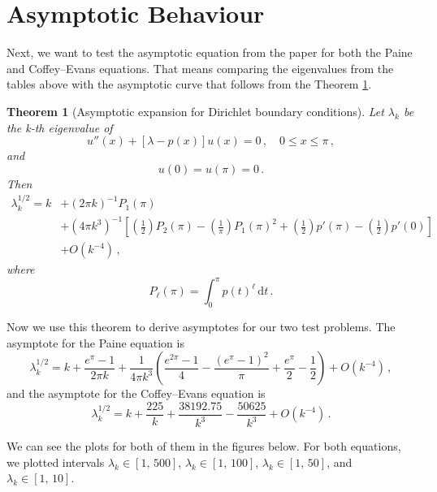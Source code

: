 \documentclass[11pt,a4paper,oneside,openright]{report} %
\newtheorem{theorem}{Theorem}
\begin{document}
\section{Asymptotic Behaviour}
\noindent
Next, we want to test the asymptotic equation from the paper \cite{fix} for both the Paine and Coffey–Evans equations. That means comparing the eigenvalues from the tables above with the asymptotic curve that follows from the Theorem \ref{theorem}.

\begin{theorem}[Asymptotic expansion for Dirichlet boundary conditions]\label{theorem}
Let $\lambda_k$ be the k-th eigenvalue of
\begin{equation}
    u''(x) + [\lambda - p(x)]u(x) = 0 \, , \quad 0 \leq x \leq \pi \, ,
\end{equation}
and
\begin{equation}
    u(0) = u(\pi) = 0 \, .
\end{equation}
Then 
\begin{equation}\label{fix_relation}
    \begin{split}
    \lambda_k^{1/2} = k & + (2\pi k)^{-1}P_1(\pi) \\[2pt]
    & + (4 \pi k^3)^{-1}\left[ \left(\frac{1}{2}\right)P_2(\pi) - \left( \frac{1}{\pi} \right) P_1(\pi)^2 + \left(\frac{1}{2}\right)p'(\pi) - \left( \frac{1}{2} \right) p'(0)  \right] \\[2pt]
    & + O(k^{-4}) \, ,
    \end{split}
\end{equation}
where 
\begin{equation}
    P_\ell(\pi) = \int_0^\pi p(t)^\ell\,\mathrm{d}t \, .
\end{equation}
\end{theorem}

Now we use this theorem to derive asymptotes for our two test problems. The asymptote for the Paine equation is
\begin{equation}
    \lambda_k^{1/2} = k + \frac{e^{\pi} - 1}{2 \pi k} + \frac{1}{4 \pi k^3} \left( \frac{e^{2 \pi} -1}{4} - \frac{(e^{\pi}-1)^2}{\pi} + \frac{e^{\pi}}{2} - \frac{1}{2} \right) + O(k^{-4}) \, ,
\end{equation}
and the asymptote for the Coffey--Evans equation is
\begin{equation}
    \lambda_k^{1/2} = k + \frac{225}{k} + \frac{38 192.75}{k^3} - \frac{50625}{k^3} + O(k^{-4}) \, .
\end{equation}

We can see the plots for both of them in the figures below. For both equations, we plotted intervals $\lambda_k \in [1, \, 500]$, $\lambda_k \in [1, \, 100]$, $\lambda_k \in [1, \, 50]$, and $\lambda_k \in [1, \, 10]$.
\end{document}
